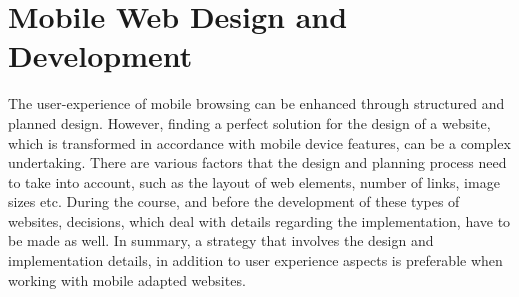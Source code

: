 \section{Mobile Web Design and Development}

The user-experience of mobile browsing can be enhanced through structured and planned design. However, finding a perfect solution for the design of a website, which is transformed in accordance with mobile device features, can be a complex undertaking. There are various factors that the design and planning process need to take into account, such as the layout of web elements, number of links, image sizes etc. During the course, and before the development of these types of websites, decisions, which deal with details regarding the implementation, have to be made as well. In summary, a strategy that involves the design and implementation details, in addition to user experience aspects is preferable when working with mobile adapted websites.